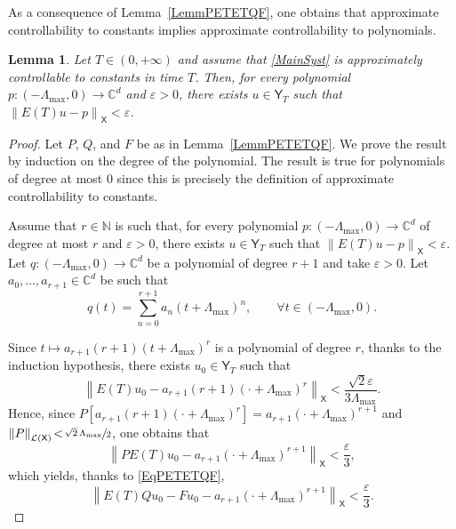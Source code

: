 \documentclass[10pt]{amsart}
\theoremstyle{plain}
\newtheorem{lemm}[theo]{Lemma}
\theoremstyle{definition}
\newcommand{\norm}[1]{\left\lVert #1\right\lVert}
\begin{document}
As a consequence of Lemma~\ref{LemmPETETQF}, one obtains that approximate controllability to constants implies approximate controllability to polynomials.

\begin{lemm}
\label{LemmApproxToPoly}
Let $T \in (0, +\infty)$ and assume that \eqref{MainSyst} is approximately controllable to constants in time $T$. Then, for every polynomial $p: (-\Lambda_{\max}, 0) \to \mathbb C^d$ and $\varepsilon > 0$, there exists $u \in \mathsf Y_T$ such that $\norm{E(T) u - p}_{\mathsf X} < \varepsilon$.
\end{lemm}

\begin{proof}
Let $P$, $Q$, and $F$ be as in Lemma~\ref{LemmPETETQF}. We prove the result by induction on the degree of the polynomial. The result is true for polynomials of degree at most $0$ since this is precisely the definition of approximate controllability to constants.

Assume that $r \in \mathbb N$ is such that, for every polynomial $p: (-\Lambda_{\max}, 0) \to \mathbb C^d$ of degree at most $r$ and $\varepsilon > 0$, there exists $u \in \mathsf Y_T$ such that $\norm{E(T) u - p}_{\mathsf X} < \varepsilon$. Let $q: (-\Lambda_{\max}, 0) \to \mathbb C^d$ be a polynomial of degree $r + 1$ and take $\varepsilon > 0$. Let $a_0, \dots, a_{r+1} \in \mathbb C^d$ be such that
\[q(t) = \sum_{n=0}^{r + 1} a_n (t + \Lambda_{\max})^n, \qquad \forall t \in (-\Lambda_{\max}, 0).\]

Since $t \mapsto a_{r+1} (r+1) (t + \Lambda_{\max})^r$ is a polynomial of degree $r$, thanks to the induction hypothesis, there exists $u_0 \in \mathsf Y_T$ such that
\[
\norm{E(T) u_0 - a_{r+1} (r+1) (\cdot + \Lambda_{\max})^r}_{\mathsf X} < \frac{\sqrt{2}\varepsilon}{3 \Lambda_{\max}}.
\]
Hence, since $P \left[a_{r+1} (r+1) (\cdot + \Lambda_{\max})^r\right] \!=\!a_{r+1} (\cdot + \Lambda_{\max})^{r+1}$ and \hbox{$\norm{P}_{\mathcal L(\mathsf X)}\!<\!\sfrac{\sqrt{2}\, \Lambda_{\max}}{2}$}, one obtains that
\[
\norm{P E(T) u_0 - a_{r+1} (\cdot + \Lambda_{\max})^{r+1}}_{\mathsf X} < \frac{\varepsilon}{3},
\]
which yields, thanks to \eqref{EqPETETQF},
\begin{equation}
\label{EstimU0}
\norm{E(T) Q u_0 - F u_0 - a_{r+1} (\cdot + \Lambda_{\max})^{r+1}}_{\mathsf X} < \frac{\varepsilon}{3}.
\end{equation}


\end{proof}
\end{document}
